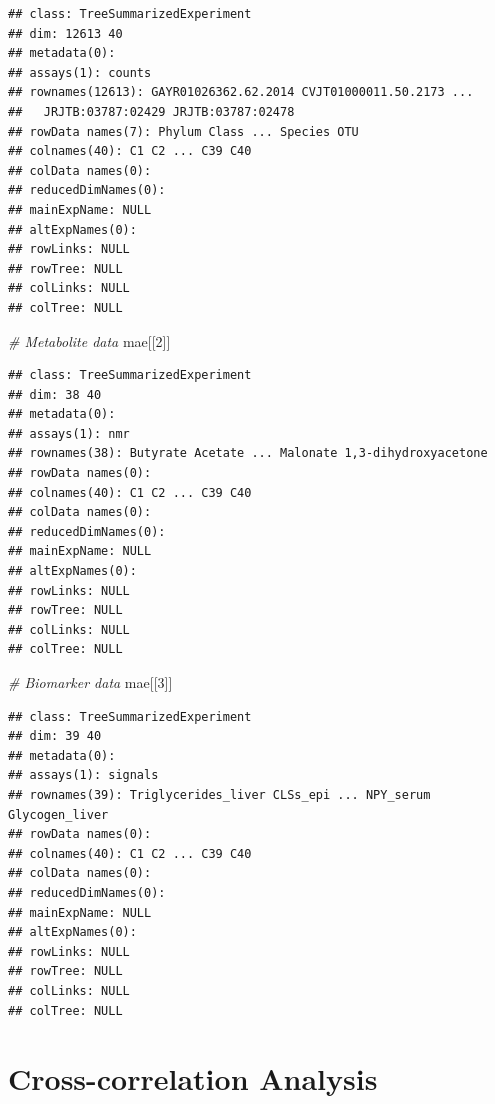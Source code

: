 \documentclass[
]{book}
\newenvironment{Shaded}{\begin{snugshade}}{\end{snugshade}}
\newcommand{\CommentTok}[1]{\textcolor[rgb]{0.56,0.35,0.01}{\textit{#1}}}
\newcommand{\DecValTok}[1]{\textcolor[rgb]{0.00,0.00,0.81}{#1}}
\newcommand{\NormalTok}[1]{#1}
\begin{document}
\begin{verbatim}
## class: TreeSummarizedExperiment 
## dim: 12613 40 
## metadata(0):
## assays(1): counts
## rownames(12613): GAYR01026362.62.2014 CVJT01000011.50.2173 ...
##   JRJTB:03787:02429 JRJTB:03787:02478
## rowData names(7): Phylum Class ... Species OTU
## colnames(40): C1 C2 ... C39 C40
## colData names(0):
## reducedDimNames(0):
## mainExpName: NULL
## altExpNames(0):
## rowLinks: NULL
## rowTree: NULL
## colLinks: NULL
## colTree: NULL
\end{verbatim}

\begin{Shaded}
\begin{Highlighting}[]
\CommentTok{\# Metabolite data}
\NormalTok{mae[[}\DecValTok{2}\NormalTok{]]}
\end{Highlighting}
\end{Shaded}

\begin{verbatim}
## class: TreeSummarizedExperiment 
## dim: 38 40 
## metadata(0):
## assays(1): nmr
## rownames(38): Butyrate Acetate ... Malonate 1,3-dihydroxyacetone
## rowData names(0):
## colnames(40): C1 C2 ... C39 C40
## colData names(0):
## reducedDimNames(0):
## mainExpName: NULL
## altExpNames(0):
## rowLinks: NULL
## rowTree: NULL
## colLinks: NULL
## colTree: NULL
\end{verbatim}

\begin{Shaded}
\begin{Highlighting}[]
\CommentTok{\# Biomarker data}
\NormalTok{mae[[}\DecValTok{3}\NormalTok{]]}
\end{Highlighting}
\end{Shaded}

\begin{verbatim}
## class: TreeSummarizedExperiment 
## dim: 39 40 
## metadata(0):
## assays(1): signals
## rownames(39): Triglycerides_liver CLSs_epi ... NPY_serum Glycogen_liver
## rowData names(0):
## colnames(40): C1 C2 ... C39 C40
## colData names(0):
## reducedDimNames(0):
## mainExpName: NULL
## altExpNames(0):
## rowLinks: NULL
## rowTree: NULL
## colLinks: NULL
## colTree: NULL
\end{verbatim}

\hypertarget{cross-correlation-analysis}{%
\section{Cross-correlation Analysis}\label{cross-correlation-analysis}}
\end{document}
